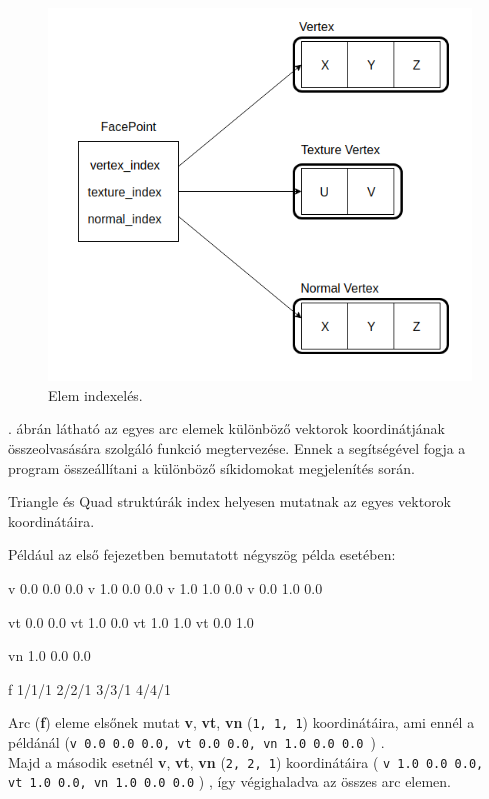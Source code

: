 \bigskip
\begin{figure}[h]
\centering
\includegraphics[scale=0.5]{images/point.png}
\caption{Elem indexelés.}
\label{fig:index_}
\end{figure}
\bigskip

. ábrán látható az egyes arc elemek különböző vektorok koordinátjának összeolvasására szolgáló funkció megtervezése. Ennek a segítségével fogja a program összeállítani a különböző síkidomokat megjelenítés során.

Triangle és Quad struktúrák index helyesen mutatnak az egyes vektorok koordinátáira.

Például az első fejezetben bemutatott négyszög példa esetében:

\begin{python} 
v 0.0 0.0 0.0
v 1.0 0.0 0.0
v 1.0 1.0 0.0
v 0.0 1.0 0.0

vt 0.0 0.0
vt 1.0 0.0
vt 1.0 1.0
vt 0.0 1.0

vn 1.0 0.0 0.0 

f 1/1/1 2/2/1 3/3/1 4/4/1
\end{python}

Arc (\textbf{f}) eleme elsőnek mutat \textbf{v}, \textbf{vt}, \textbf{vn} (\texttt{1, 1, 1}) koordinátáira, ami ennél a példánál (\texttt{v 0.0 0.0 0.0, vt 0.0 0.0, vn 1.0 0.0 0.0 }) . \\

Majd a második esetnél \textbf{v}, \textbf{vt}, \textbf{vn} (\texttt{2, 2, 1}) koordinátáira ( \texttt{v 1.0 0.0 0.0, \\vt 1.0 0.0, vn 1.0 0.0 0.0} ) , így végighaladva az összes arc elemen.


